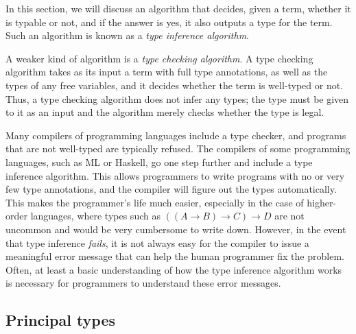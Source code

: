 \documentclass[12pt]{article}
\begin{document}
In this section, we will discuss an algorithm that decides, given a
term, whether it is typable or not, and if the answer is yes, it also
outputs a type for the term. Such an algorithm is known as a {\em type
  inference algorithm}.

A weaker kind of algorithm is a {\em type checking algorithm}. A type
checking algorithm takes as its input a term with full type
annotations, as well as the types of any free variables, and it
decides whether the term is well-typed or not. Thus, a type checking
algorithm does not infer any types; the type must be given to it as an
input and the algorithm merely checks whether the type is legal. 

Many compilers of programming languages include a type checker, and
programs that are not well-typed are typically refused.  The compilers
of some programming languages, such as ML or Haskell, go one step
further and include a type inference algorithm. This allows
programmers to write programs with no or very few type annotations,
and the compiler will figure out the types automatically. This makes
the programmer's life much easier, especially in the case of
higher-order languages, where types such as $((A\to B)\to C)\to D$ are
not uncommon and would be very cumbersome to write down. However, in
the event that type inference {\em fails}, it is not always easy for
the compiler to issue a meaningful error message that can help the
human programmer fix the problem. Often, at least a basic
understanding of how the type inference algorithm works is necessary
for programmers to understand these error messages.

\subsection{Principal types}
\end{document}
